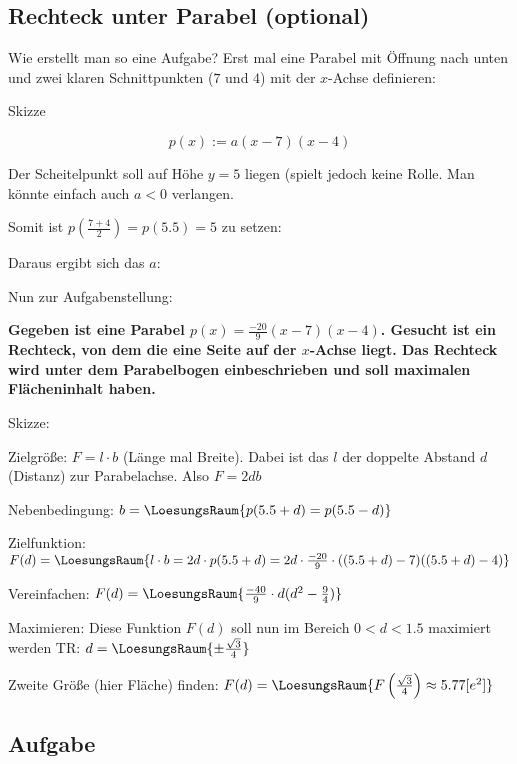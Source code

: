\subsection{Rechteck unter Parabel (optional)}

Wie erstellt man so eine Aufgabe? Erst mal eine Parabel mit Öffnung nach unten und zwei klaren Schnittpunkten (\zB $7$ und $4$) mit der $x$-Achse definieren:

Skizze


$$p(x) := a(x-7)(x-4)$$

Der Scheitelpunkt soll auf Höhe $y=5$ liegen (spielt jedoch keine Rolle. Man könnte einfach auch $a<0$ verlangen.

Somit ist $p(\frac{7+4}2) = p(5.5) = 5$ zu setzen:



Daraus ergibt sich das $a$:

\newpage

Nun zur Aufgabenstellung:

\textbf{Gegeben ist eine Parabel $p(x) = \frac{-20}9(x-7)(x-4)$. Gesucht ist ein Rechteck, von dem die eine Seite auf der $x$-Achse liegt. Das Rechteck wird unter dem Parabelbogen einbeschrieben und soll maximalen Flächeninhalt haben.}

Skizze:


Zielgröße: $F = l\cdot{}b$ (Länge mal Breite). Dabei ist das $l$ der doppelte Abstand $d$ (Distanz) zur Parabelachse.
Also $F = 2db$

Nebenbedingung: $b = \LoesungsRaum{p(5.5 + d) = p(5.5-d)}$

Zielfunktion: $F(d) = \LoesungsRaum{l\cdot{}b = 2d\cdot{}p(5.5+d) = 2d\cdot{}\frac{-20}9\cdot((5.5+d)-7)((5.5+d)-4)}$

Vereinfachen:
$F(d) = \LoesungsRaum{\frac{-40}9\cdot{}d(d^2-\frac94)}$

Maximieren: Diese Funktion $F(d)$ soll nun im Bereich $0<d<1.5$ maximiert werden TR: $d = \LoesungsRaum{\pm\frac{\sqrt{3}}4}$

Zweite Größe (hier Fläche) finden: $F(d) = \LoesungsRaum{F\left(\frac{\sqrt{3}}4\right) \approx 5.77 [e^2]}$

\subsection*{Aufgabe}
